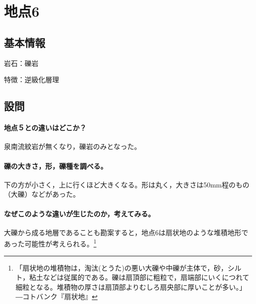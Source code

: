 \documentclass[uplatex,b5paper]{jsreport}
\begin{document}
  \section{地点6}
    \subsection{基本情報}
    岩石：礫岩 \par
    特徴：逆級化層理
    \subsection{設問}
      \paragraph{地点５との違いはどこか？}
      泉南流紋岩が無くなり，礫岩のみとなった。
      \paragraph{礫の大きさ，形，礫種を調べる。}
      下の方が小さく，上に行くほど大きくなる。形は丸く，大きさは50mm程のもの（大礫）などがあった。
      \paragraph{なぜこのような違いが生じたのか，考えてみる。}
      大礫から成る地層であることも勘案すると，地点6は扇状地のような堆積地形であった可能性が考えられる。\footnote{「扇状地の堆積物は，淘汰(とうた)の悪い大礫や中礫が主体で，砂，シルト，粘土などは従属的である。礫は扇頂部に粗粒で，扇端部にいくにつれて細粒となる。堆積物の厚さは扇頂部よりむしろ扇央部に厚いことが多い。」―コトバンク『扇状地』}
\end{document}
